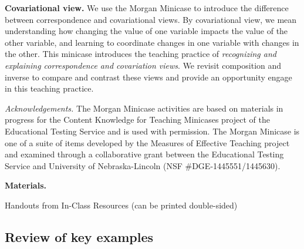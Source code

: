 \documentclass[11pt]{article}
\newenvironment{bignote}[1][Instructor note]%
	{\begin{mdframed}\raggedright{\bf #1.~}}
	{\end{mdframed}}
\theoremstyle{definition}
\begin{document}
{\bf Covariational view.} We use the Morgan Minicase to introduce the difference between correspondence and covariational views. By covariational view, we mean understanding how changing the value of one variable impacts the value of the other variable, and learning to coordinate changes in one variable with changes in the other. This minicase introduces the teaching practice of {\it recognizing and explaining correspondence and covariation views}. We revisit composition and inverse to compare and contrast these views and provide an opportunity engage in this teaching practice. 

{\it Acknowledgements.} The Morgan Minicase activities are based on materials in progress for the Content Knowledge for Teaching Minicases project of the Educational Testing Service and is used with permission. The Morgan Minicase is one of a suite of items developed by the Measures of Effective Teaching project and examined through a collaborative grant between the Educational Testing Service and University of Nebraska-Lincoln (NSF \#DGE-1445551/1445630).


\newpage
\begin{bignote}[Materials]
\begin{itemize*}
\item Handouts from In-Class Resources (can be printed double-sided)
\end{itemize*}
\end{bignote}

\vspace*{-12pt}
\subsection{Review of key examples}

\end{document}
